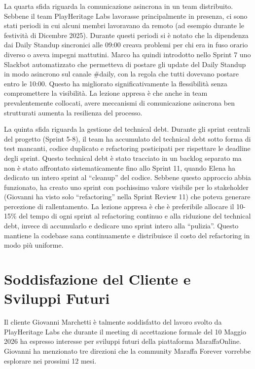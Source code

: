 La quarta sfida riguarda la comunicazione asincrona in un team distribuito. Sebbene il team PlayHeritage Labs lavorasse principalmente in presenza, ci sono stati periodi in cui alcuni membri lavoravano da remoto (ad esempio durante le festività di Dicembre 2025). Durante questi periodi si è notato che la dipendenza dai Daily Standup sincronici alle 09:00 creava problemi per chi era in fuso orario diverso o aveva impegni mattutini. Marco ha quindi introdotto nello Sprint 7 uno Slackbot automatizzato che permetteva di postare gli update del Daily Standup in modo asincrono sul canale \#daily, con la regola che tutti dovevano postare entro le 10:00. Questo ha migliorato significativamente la flessibilità senza compromettere la visibilità. La lezione appresa è che anche in team prevalentemente collocati, avere meccanismi di comunicazione asincrona ben strutturati aumenta la resilienza del processo.

La quinta sfida riguarda la gestione del technical debt. Durante gli sprint centrali del progetto (Sprint 5-8), il team ha accumulato del technical debt sotto forma di test mancanti, codice duplicato e refactoring posticipati per rispettare le deadline degli sprint. Questo technical debt è stato tracciato in un backlog separato ma non è stato affrontato sistematicamente fino allo Sprint 11, quando Elena ha dedicato un intero sprint al ``cleanup'' del codice. Sebbene questo approccio abbia funzionato, ha creato uno sprint con pochissimo valore visibile per lo stakeholder (Giovanni ha visto solo ``refactoring'' nella Sprint Review 11) che poteva generare percezione di rallentamento. La lezione appresa è che è preferibile allocare il 10-15\% del tempo di ogni sprint al refactoring continuo e alla riduzione del technical debt, invece di accumularlo e dedicare uno sprint intero alla ``pulizia''. Questo mantiene la codebase sana continuamente e distribuisce il costo del refactoring in modo più uniforme.

\section{Soddisfazione del Cliente e Sviluppi Futuri}

Il cliente Giovanni Marchetti è talmente soddisfatto del lavoro svolto da PlayHeritage Labs che durante il meeting di accettazione formale del 10 Maggio 2026 ha espresso interesse per sviluppi futuri della piattaforma MaraffaOnline. Giovanni ha menzionato tre direzioni che la community Maraffa Forever vorrebbe esplorare nei prossimi 12 mesi.

